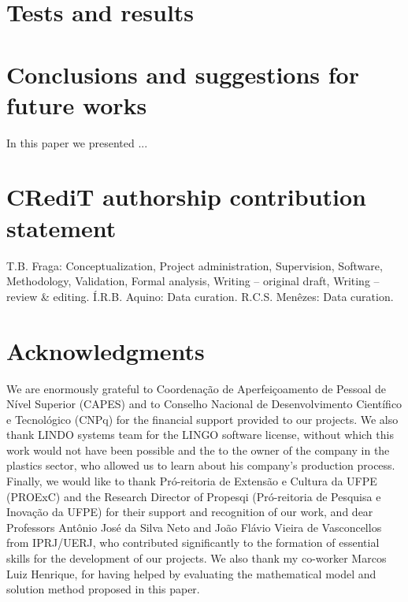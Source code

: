 \documentclass[authoryear,manuscript,12pt]{elsarticle}
\begin{document}
\section{Tests and results}
\label{sec:results}



\section{Conclusions and suggestions for future works}
\label{sec:conclusions}

In this paper we presented ...

\section{CRediT authorship contribution statement} 
\label{sec:contributions}

T.B. Fraga: Conceptualization, Project administration, Supervision, Software, Methodology, Validation, Formal analysis, Writing – original draft, Writing – review \& editing. Í.R.B. Aquino: Data curation. R.C.S. Menêzes: Data curation.

\section{Acknowledgments}
\label{sec:acknowledgments}

We are enormously grateful to Coordenação de Aperfeiçoamento de Pessoal de Nível Superior (CAPES) and to Conselho Nacional de Desenvolvimento Científico e Tecnológico (CNPq) for the financial support provided to our projects. We also thank LINDO systems team for the LINGO software license, without which this work would not have been possible and the to the owner of the company in the plastics sector, who allowed us to learn about his company's production process. Finally, we would like to thank Pró-reitoria de Extensão e Cultura da UFPE (PROExC) and the Research Director of Propesqi (Pró-reitoria de Pesquisa e Inovação da UFPE) for their support and recognition of our work, and dear Professors Antônio José da Silva Neto and João Flávio Vieira de Vasconcellos from IPRJ/UERJ, who contributed significantly to the formation of essential skills for the development of our projects. We also thank my co-worker Marcos Luiz Henrique, for having helped by evaluating the mathematical model and solution method proposed in this paper.

\end{document}
